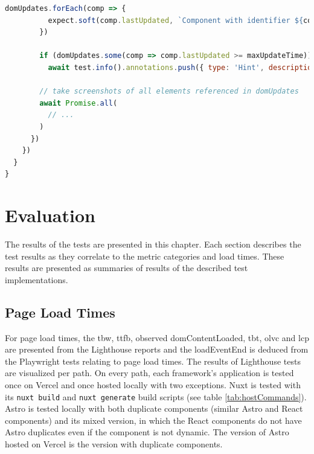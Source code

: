 \documentclass[a4paper, 12pt]{article}
\begin{document}
\begin{lstlisting}[caption={Test file for component update times}, label={lst:state-change-spec}, language=JavaScript, escapechar=°]
        domUpdates.forEach(comp => {
          expect.soft(comp.lastUpdated, `Component with identifier ${comp.id} should finish updates within ${maxUpdateTime} ms`).toBeLessThanOrEqual(maxUpdateTime)
        })

        if (domUpdates.some(comp => comp.lastUpdated >= maxUpdateTime))
          await test.info().annotations.push({ type: 'Hint', description: `Screenshots below show slow updating components` });

        // take screenshots of all elements referenced in domUpdates
        await Promise.all(
          // ...
        )
      })
    })
  }
}
\end{lstlisting}
\vspace{1cm}
  
\section{Evaluation}\label{sec:evaluation}

The results of the tests are presented in this chapter.
Each section describes the test results as they correlate to the metric categories and load times.
These results are presented as summaries of results of the described test implementations.

\subsection{Page Load Times}\label{subsec:pageloadtimes}

For page load times, the \acrfull{tbw}, \acrfull{ttfb}, observed domContentLoaded, \acrfull{tbt}, \acrfull{olvc} and \acrfull{lcp} are presented from the Lighthouse reports and the loadEventEnd is deduced from the Playwright tests relating to page load times.
The results of Lighthouse tests are visualized per path.
On every path, each framework's application is tested once on Vercel and once hosted locally with two exceptions.
Nuxt is tested with its \verb|nuxt build| and \verb|nuxt generate| build scripts (see table \ref{tab:hostCommands}).
Astro is tested locally with both duplicate components (similar Astro and React components) and its mixed version, in which the React components do not have Astro duplicates even if the component is not dynamic.
The version of Astro hosted on Vercel is the version with duplicate components.
\end{document}

